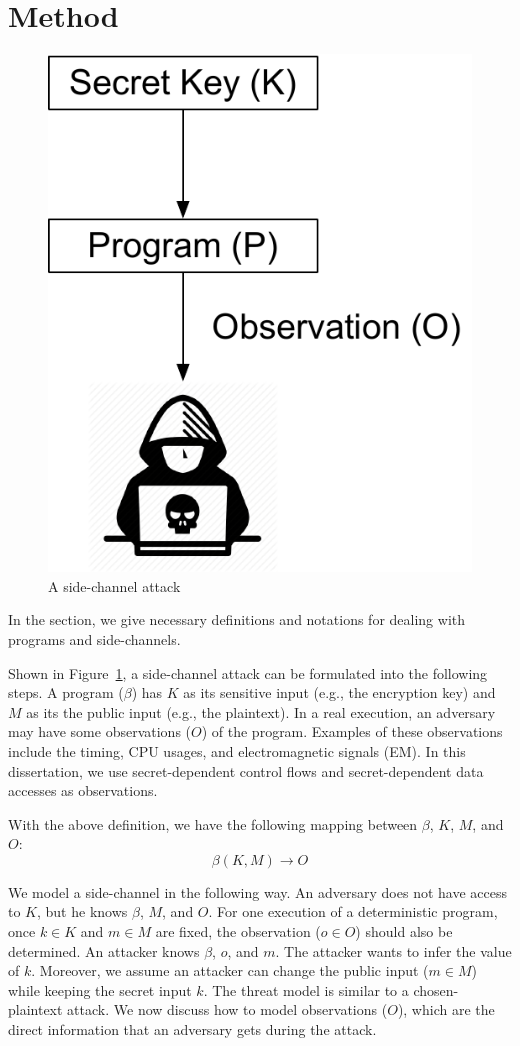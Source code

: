 \section{Method}\label{chapter3:method}
\begin{figure}[ht]
  \centering
  \includegraphics[width=.3\columnwidth]{./figures/chapter3/attack.pdf}
  \caption{A side-channel attack}\label{fig:side-channel-attack}
\end{figure}

In the section, we give necessary definitions and notations for dealing with
programs and side-channels.

Shown in Figure~\ref{fig:side-channel-attack}, a side-channel attack can be formulated into the following steps.  A program ($\beta$) has $K$ as its sensitive input (e.g., the encryption key) and $M$ as its the public input (e.g., the plaintext). In a real execution, an adversary may have
some observations ($O$) of the program. Examples of these observations include the timing, CPU usages, and electromagnetic signals (EM). In this dissertation, we use secret-dependent control flows and secret-dependent data
accesses as observations.

With the above definition, we have the following mapping between $\beta$, $K$, $M$, and $O$:
\begin{displaymath}
  \beta(K, M) \rightarrow O
\end{displaymath}


We model a side-channel in the following way. An adversary does not have
access to $K$, but he knows $\beta$, $M$, and $O$. For one execution of a
deterministic program, once $k \in K$ and $m \in M$ are fixed, the observation
($o \in O$) should also be determined. An attacker knows $\beta$, $o$,
and $m$. The attacker wants to infer the value of $k$. Moreover, we assume
an attacker can change the public input ($m \in M$) while keeping the secret input $k$. The threat model is similar to a chosen-plaintext attack.
We now discuss how to model observations ($O$),
which are the direct information that an adversary gets during the attack.

